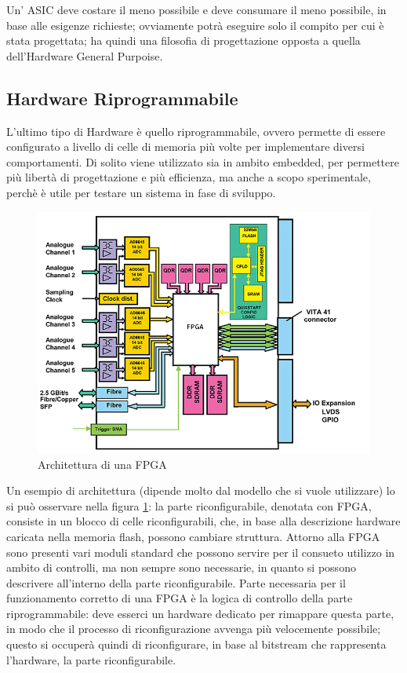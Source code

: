 \documentclass[11pt]{article} %
\begin{document}
Un' ASIC deve costare il meno possibile e deve consumare il meno possibile, in base alle esigenze richieste; ovviamente potrà eseguire solo il compito per cui è stata progettata; ha quindi una filosofia di progettazione opposta a quella dell'Hardware General Purpoise.

\subsection{Hardware Riprogrammabile}
L'ultimo tipo di Hardware è quello riprogrammabile, ovvero permette di essere configurato a livello di celle di memoria più volte per implementare diversi comportamenti. Di solito viene utilizzato sia in ambito embedded, per permettere più libertà di progettazione e più efficienza, ma anche a scopo sperimentale, perchè è utile per testare un sistema in fase di sviluppo.

\begin{figure}
\centering
\includegraphics[scale=0.6]{fpga.png}
\caption{Architettura di una FPGA}\label{fig:00}
\end{figure}

Un esempio di architettura (dipende molto dal modello che si vuole utilizzare) lo si può osservare nella figura \ref{fig:00}: la parte riconfigurabile, denotata con FPGA, consiste in un blocco di celle riconfigurabili, che, in base alla descrizione hardware caricata nella memoria flash, possono cambiare struttura. Attorno alla FPGA sono presenti vari moduli standard che possono servire per il consueto utilizzo in ambito di controlli, ma non sempre sono necessarie, in quanto si possono descrivere all'interno della parte riconfigurabile. Parte necessaria per il funzionamento corretto di una FPGA è la logica di controllo della parte riprogrammabile: deve esserci un hardware dedicato per rimappare questa parte, in modo che il processo di riconfigurazione avvenga più velocemente possibile; questo si occuperà quindi di riconfigurare, in base al bitstream che rappresenta l'hardware, la parte riconfigurabile.
\end{document}
